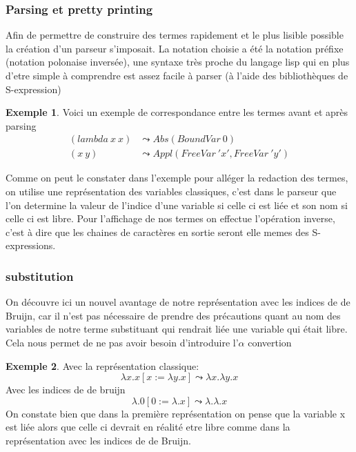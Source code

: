 \documentclass {article}
\theoremstyle{definition}
\newtheorem{example}{Exemple}
\theoremstyle{remark}
\begin{document}
\subsubsection{Parsing et pretty printing}
Afin de permettre de construire des termes rapidement et le plus lisible 
possible la création d'un parseur s'imposait.
La notation choisie a été la notation préfixe (notation polonaise inversée),
une syntaxe très proche du langage lisp qui en plus d'etre simple à comprendre
est assez facile à parser (à l'aide des bibliothèques de S-expression)
\begin{example}
  Voici un exemple de correspondance entre les termes avant et après parsing
  \begin{align*}
    (lambda\: x \: x) & \leadsto Abs(BoundVar\: 0) \\
    (x\: y) & \leadsto Appl(FreeVar\: 'x',FreeVar\: 'y')       
  \end{align*}
\end{example}

Comme on peut le constater dans l'exemple pour alléger la redaction des termes,
on utilise une représentation des variables classiques, c'est dans le parseur que 
l'on determine la valeur de l'indice d'une variable si celle ci est liée et son 
nom si celle ci est libre.
Pour l'affichage de nos termes on effectue l'opération inverse, c'est à dire que
les chaines de caractères en sortie seront elle memes des S-expressions.



\subsubsection{substitution}

On découvre ici un nouvel avantage de notre représentation avec les indices de
de Bruijn, car il n'est pas nécessaire de prendre des précautions quant au
nom des variables de notre terme substituant %
qui rendrait liée une variable qui était libre. Cela nous permet de ne pas 
avoir besoin d'introduire l'\(\alpha\) convertion

\begin{example}
  Avec la représentation classique: 
  \[ 
  \lambda x.x[x := \lambda y.x]\leadsto\lambda x.\lambda y.x
  \]
  Avec les indices de de bruijn
  \[ 
  \lambda.0[0 := \lambda.x]\leadsto\lambda.\lambda.x
  \]
  On constate bien que dans la première représentation on pense que la variable
  x est liée alors que celle ci devrait en réalité etre libre comme dans la 
  représentation avec les indices de de Bruijn.
\end{example}
\end{document}
